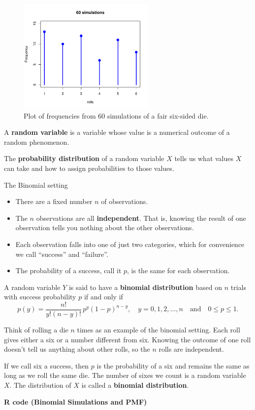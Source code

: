 \begin{figure}[H]
  \centering
  \includegraphics[width=0.6\textwidth]{section11/images/simulation_60.pdf} 
  \vspace{-1em} %
\captionsetup{skip=0pt}
  \caption{Plot of frequencies from 60 simulations of a fair six-sided die.}
\end{figure}
\begin{definition}
A \textbf{random variable} is a variable whose value is a numerical outcome of a random phenomenon.

The \textbf{probability distribution} of a random variable $X$ tells us what values $X$ can take and how to assign probabilities to those values.
\end{definition}
\begin{nt}{The Binomial setting}
\begin{itemize}
  \item There are a fixed number $n$ of observations.
  \item The $n$ observations are all \textbf{independent}. That is, knowing the result of one observation tells you nothing about the other observations.
  \item Each observation falls into one of just two categories, which for convenience we call “success” and “failure”.
  \item The probability of a success, call it $p$, is the same for each observation.
\end{itemize}
\end{nt}
\noindent A random variable $Y$ is said to have a \textbf{binomial distribution} based on $n$ trials with success probability $p$ if and only if
\[
p(y) = \frac{n!}{y!(n - y)!} \, p^y (1 - p)^{n - y}, \quad y = 0, 1, 2, \ldots, n \quad \text{and} \quad 0 \leq p \leq 1.
\]
\begin{example}
Think of rolling a die $n$ times as an example of the binomial setting. Each roll gives either a six or a number different from six. Knowing the outcome of one roll doesn’t tell us anything about other rolls, so the $n$ rolls are independent. 

If we call six a success, then $p$ is the probability of a six and remains the same as long as we roll the same die. The number of sixes we count is a random variable $X$. The distribution of $X$ is called a \textbf{binomial distribution}.
\end{example}
\vspace{1em}
\noindent\textbf{R code (Binomial Simulations and PMF)}

